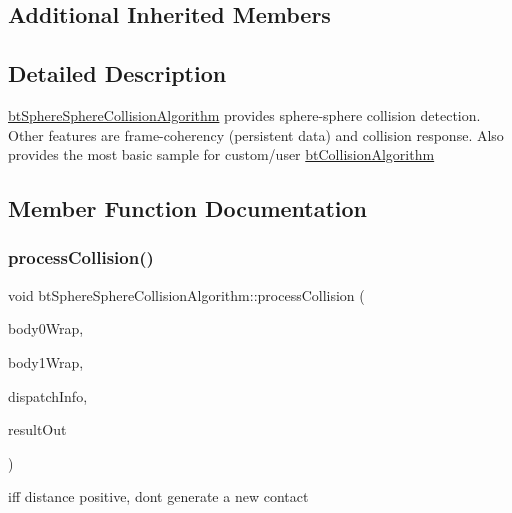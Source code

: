 \subsection*{Additional Inherited Members}


\subsection{Detailed Description}
\hyperlink{classbtSphereSphereCollisionAlgorithm}{bt\+Sphere\+Sphere\+Collision\+Algorithm} provides sphere-\/sphere collision detection. Other features are frame-\/coherency (persistent data) and collision response. Also provides the most basic sample for custom/user \hyperlink{classbtCollisionAlgorithm}{bt\+Collision\+Algorithm} 

\subsection{Member Function Documentation}
\mbox{\label{classbtSphereSphereCollisionAlgorithm_a7e5adac437f8c0cdb738360d5946a65d}} 
\subsubsection{\texorpdfstring{process\+Collision()}{processCollision()}}
{\footnotesize\ttfamily void bt\+Sphere\+Sphere\+Collision\+Algorithm\+::process\+Collision (\begin{DoxyParamCaption}\item[{const \hyperlink{structbtCollisionObjectWrapper}{bt\+Collision\+Object\+Wrapper} $\ast$}]{body0\+Wrap,  }\item[{const \hyperlink{structbtCollisionObjectWrapper}{bt\+Collision\+Object\+Wrapper} $\ast$}]{body1\+Wrap,  }\item[{const \hyperlink{structbtDispatcherInfo}{bt\+Dispatcher\+Info} \&}]{dispatch\+Info,  }\item[{\hyperlink{classbtManifoldResult}{bt\+Manifold\+Result} $\ast$}]{result\+Out }\end{DoxyParamCaption})\hspace{0.3cm}{\ttfamily [virtual]}}

iff distance positive, don\textquotesingle{}t generate a new contact

